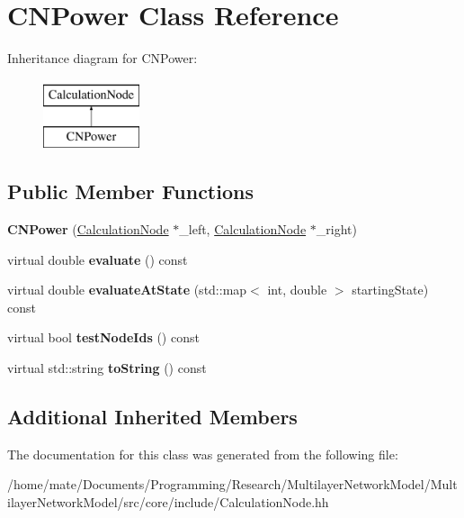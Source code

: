 \hypertarget{classCNPower}{}\section{C\+N\+Power Class Reference}
\label{classCNPower}
Inheritance diagram for C\+N\+Power\+:\begin{figure}[H]
\begin{center}
\leavevmode
\includegraphics[height=2.000000cm]{classCNPower}
\end{center}
\end{figure}
\subsection*{Public Member Functions}
\begin{DoxyCompactItemize}
\item 
{\bfseries C\+N\+Power} (\hyperlink{classCalculationNode}{Calculation\+Node} $\ast$\+\_\+left, \hyperlink{classCalculationNode}{Calculation\+Node} $\ast$\+\_\+right)\hypertarget{classCNPower_ac5ba8a91170451bc06afbf7153d7f707}{}\label{classCNPower_ac5ba8a91170451bc06afbf7153d7f707}

\item 
virtual double {\bfseries evaluate} () const \hypertarget{classCNPower_a9461646cf8e9fc0cb54318e04d73ed72}{}\label{classCNPower_a9461646cf8e9fc0cb54318e04d73ed72}

\item 
virtual double {\bfseries evaluate\+At\+State} (std\+::map$<$ int, double $>$ starting\+State) const \hypertarget{classCNPower_af4a31cbe51bc44fba203bda91d46384f}{}\label{classCNPower_af4a31cbe51bc44fba203bda91d46384f}

\item 
virtual bool {\bfseries test\+Node\+Ids} () const \hypertarget{classCNPower_a3d1e004e5e71954037b2ea46f54cd438}{}\label{classCNPower_a3d1e004e5e71954037b2ea46f54cd438}

\item 
virtual std\+::string {\bfseries to\+String} () const \hypertarget{classCNPower_a5d9c427cba2ea13f2bf91ecadcac50ef}{}\label{classCNPower_a5d9c427cba2ea13f2bf91ecadcac50ef}

\end{DoxyCompactItemize}
\subsection*{Additional Inherited Members}


The documentation for this class was generated from the following file\+:\begin{DoxyCompactItemize}
\item 
/home/mate/\+Documents/\+Programming/\+Research/\+Multilayer\+Network\+Model/\+Multilayer\+Network\+Model/src/core/include/Calculation\+Node.\+hh\end{DoxyCompactItemize}
